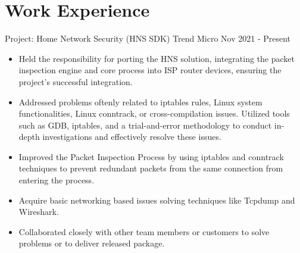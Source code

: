 \section{Work Experience}

{Project: Home Network Security (HNS SDK)}
{Trend Micro}
{Nov 2021 - Present}

\begin{itemize}
  \setlength\topsep{0em}
  \setlength\parskip{0em}
  \setlength\parsep{0em}
  \setlength\itemsep{0em}

  \item Held the responsibility for porting the HNS solution, integrating the packet inspection engine and core process into ISP router devices, ensuring the project's successful integration.
  \item Addressed problems oftenly related to iptables rules, Linux system functionalities, Linux conntrack, or cross-compilation issues. Utilized tools such as GDB, iptables, and a trial-and-error methodology to conduct in-depth investigations and effectively resolve these issues.
  \item Improved the Packet Inspection Process by using iptables and conntrack techniques to prevent redundant packets from the same connection from entering the process.
  \item Acquire basic networking based issues solving techniques like Tcpdump and Wireshark.
  \item Collaborated closely with other team members or customers to solve problems or to deliver released package.
\end{itemize}


